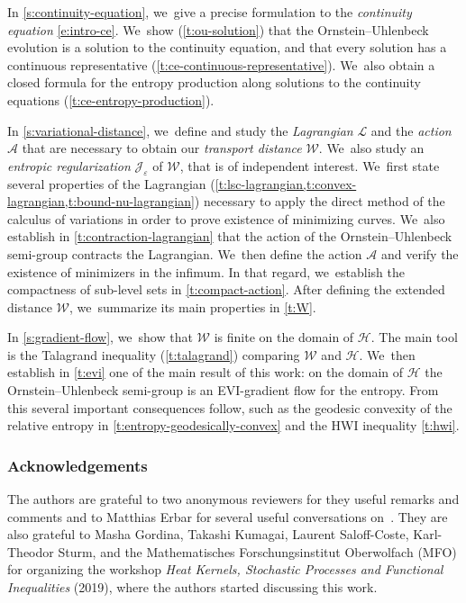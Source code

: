 \documentclass[JEP,XML,SOM,Unicode,published]{cedram}
\theoremstyle{definition}
\theoremstyle{remark}
\begin{document}
In \cref{s:continuity-equation}, we~give a precise formulation to the \emph{continuity equation} \cref{e:intro-ce}. We~show (\cref{t:ou-solution}) that the Ornstein--Uhlenbeck evolution is a solution to the continuity equation, and that every solution has a continuous representative (\cref{t:ce-continuous-representative}). We~also obtain a closed formula for the entropy production along solutions to the continuity equations (\cref{t:ce-entropy-production}).

In \cref{s:variational-distance}, we~define and study the \emph{Lagrangian} $\mathcal{L}$ and the \emph{action} $\mathcal{A}$ that are necessary to obtain our \emph{transport distance} $\mathcal{W}$. We~also study an \emph{entropic regularization} $\mathcal{J}_{\varepsilon}$ of $\mathcal{W}$, that is of independent interest. We~first state several properties of the Lagrangian (\cref{t:lsc-lagrangian,t:convex-lagrangian,t:bound-nu-lagrangian}) necessary to apply the direct method of the calculus of variations in order to prove existence of minimizing curves. We~also establish in \cref{t:contraction-lagrangian} that the action of the Ornstein--Uhlenbeck semi-group contracts the Lagrangian. We~then define the action $\mathcal{A}$ and verify the existence of minimizers in the infimum.
In that regard, we~establish the compactness of sub-level sets in \cref{t:compact-action}.
After defining the extended distance $\mathcal{W}$, we~summarize its main properties in \cref{t:W}.

In \cref{s:gradient-flow}, we~show that $\mathcal{W}$ is finite on the domain of $\mathcal{H}$.
The main tool is the Talagrand inequality (\cref{t:talagrand}) comparing $\mathcal{W}$ and $\mathcal{H}$. We~then establish in \cref{t:evi} one of the main result of this work: on the domain of $\mathcal{H}$ the Ornstein--Uhlenbeck semi-group is an EVI-gradient flow for the entropy.
From this several important consequences follow, such as the geodesic convexity of the relative entropy in \cref{t:entropy-geodesically-convex} and the HWI inequality \cref{t:hwi}.

\subsubsection*{Acknowledgements}
The authors are grateful to two anonymous reviewers for they useful remarks and comments and to Matthias Erbar for several useful conversations on~\cite{Erbar}.
They are also grateful to Masha Gordina, Takashi Kumagai, Laurent Saloff-Coste, Karl-Theodor Sturm, and the Mathematisches Forschungsinstitut Oberwolfach (MFO) for organizing the workshop \emph{Heat Kernels, Stochastic Processes and Functional Inequalities} (2019), where the authors started discussing this work.
\end{document}
